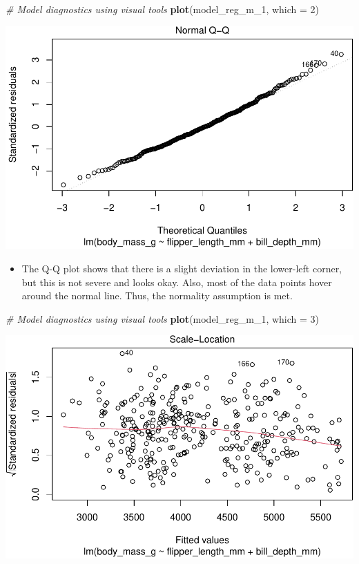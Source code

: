 \documentclass[
]{book}
\newenvironment{Shaded}{\begin{snugshade}}{\end{snugshade}}
\newcommand{\AttributeTok}[1]{\textcolor[rgb]{0.13,0.29,0.53}{#1}}
\newcommand{\CommentTok}[1]{\textcolor[rgb]{0.56,0.35,0.01}{\textit{#1}}}
\newcommand{\DecValTok}[1]{\textcolor[rgb]{0.00,0.00,0.81}{#1}}
\newcommand{\FunctionTok}[1]{\textcolor[rgb]{0.13,0.29,0.53}{\textbf{#1}}}
\newcommand{\NormalTok}[1]{#1}
\providecommand{\tightlist}{%
  \setlength{\itemsep}{0pt}\setlength{\parskip}{0pt}}
\begin{document}
\begin{Shaded}
\begin{Highlighting}[]
\CommentTok{\# Model diagnostics using visual tools}
\FunctionTok{plot}\NormalTok{(model\_reg\_m\_1, }\AttributeTok{which =} \DecValTok{2}\NormalTok{)}
\end{Highlighting}
\end{Shaded}

\includegraphics{PSY202A-Modeling-I.Heo_files/figure-latex/unnamed-chunk-119-1.pdf}

\begin{itemize}
\tightlist
\item
  The Q-Q plot shows that there is a slight deviation in the lower-left corner, but this is not severe and looks okay. Also, most of the data points hover around the normal line. Thus, the normality assumption is met.
\end{itemize}

\begin{Shaded}
\begin{Highlighting}[]
\CommentTok{\# Model diagnostics using visual tools}
\FunctionTok{plot}\NormalTok{(model\_reg\_m\_1, }\AttributeTok{which =} \DecValTok{3}\NormalTok{)}
\end{Highlighting}
\end{Shaded}

\includegraphics{PSY202A-Modeling-I.Heo_files/figure-latex/unnamed-chunk-120-1.pdf}
\end{document}
